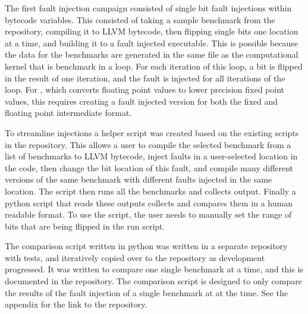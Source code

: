 The first fault injection campaign consisted of single bit fault injections within bytecode variables. This consisted of taking a sample benchmark from the \taffo{} repository, compiling it to LLVM bytecode, then flipping single bits one location at a time, and building it to a fault injected executable. This is possible because the data for the benchmarks are generated in the same file as the computational kernel that is benchmark in a loop. For each iteration of this loop, a bit is flipped in the result of one iteration, and the fault is injected for all iterations of the loop. For \taffo{}, which converts floating point values to lower precision fixed point values, this requires creating a fault injected version for both the fixed and floating point intermediate format.


To streamline injections a helper script was created based on the existing scripts in the \taffo{} repository. This allows a user to compile the selected benchmark from a list of benchmarks to LLVM bytecode, inject faults in a user-selected location in the code, then change the bit location of this fault, and compile many different versions of the same benchmark with different faults injected in the same location. The script then runs all the benchmarks and collects output. Finally a python script that reads these outputs collects and compares them in a human readable format. To use the script, the user needs to manually set the range of bits that are being flipped in the run script. 

The comparison script written in python was written in a separate repository with tests, and iteratively copied over to the \taffo{} repository as development progressed. It was written to compare one single benchmark at a time, and this is documented in the repository. The comparison script is designed to only compare the results of the fault injection of a single benchmark at at the time. See the appendix for the link to the repository.




